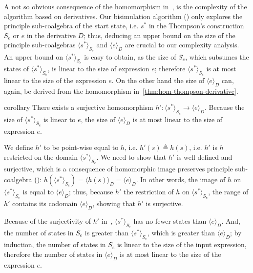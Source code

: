 \documentclass[conference]{IEEEtran}
\begin{document}
A not so obvious consequence of the homomorphism in~, is the complexity of the algorithm based on derivatives.
Our bisimulation algorithm () only explores the principle sub-coalgebra of the start state, i.e. \(s^*\) in the Thompson's construction \(Ŝ_{e}\) or \(e\) in the derivative \(D̂\); thus, deducing an upper bound on the size of the principle sub-coalgebras \(⟨s^*⟩_{Ŝ_{e}}\) and \(⟨e⟩_{D̂}\) are crucial to our complexity analysis.
An upper bound on \(⟨s^*⟩_{Ŝ_{e}}\) is easy to obtain, as the size of \(Ŝ_{e}\), which subsumes the states of \(⟨s^*⟩_{Ŝ_{e}}\), is linear to the size of expression \(e\); therefore \(⟨s^*⟩_{Ŝ_{e}}\) is at most linear to the size of the expression \(e\).
On the other hand the size of \(⟨e⟩_{D̂}\) can, again, be derived from the homomorphism in~\cref{thm:hom-thompson-derivative}.

\begin{theoremEnd}{corollary}\label{thm:suj-hom-thompson-derivative}
    There exists a surjective homomorphism \(h': ⟨s^*⟩_{Ŝ_{e}} → ⟨e⟩_{D̂}\). 
    Because the size of \(⟨s^*⟩_{Ŝ_{e}}\) is linear to \(e\), the size of \(⟨e⟩_{D̂}\) is at most linear to the size of expression \(e\).
\end{theoremEnd}

\begin{proofEnd}
    We define \(h'\) to be point-wise equal to \(h\), i.e. \(h'(s) ≜ h(s)\), i.e. \(h'\) is \(h\) restricted on the domain \(⟨s^*⟩_{Ŝ_{e}}\). 
    We need to show that \(h'\) is well-defined and surjective, which is a consequence of homomorphic image preserves principle sub-coalgebra (): \(h(⟨s^*⟩_{Ŝ_{e}}) = ⟨h(s)⟩_{D̂} = ⟨e⟩_{D̂}.\)
    In other words, the image of \(h\) on \(⟨s^*⟩_{Ŝ_{e}}\) is equal to \(⟨e⟩_{D̂}\); thus, because \(h'\) the restriction of \(h\) on \(⟨s^*⟩_{Ŝ_{e}}\), the range of \(h'\) contains its codomain \(⟨e⟩_{D̂}\), showing that \(h'\) is surjective.
\end{proofEnd}

Because of the surjectivity of \(h'\) in~, \(⟨s^*⟩_{Ŝ_{e}}\) has no fewer states than \(⟨e⟩_{D̂}\).
And, the number of states in \(Ŝ_{e}\) is greater than \(⟨s^*⟩_{Ŝ_{e}}\), which is greater than \(⟨e⟩_{D̂}\); by induction, the number of states in \(Ŝ_{e}\) is linear to the size of the input expression, therefore the number of states in \(⟨e⟩_{D̂}\) is at most linear to the size of the expression \(e\). 
\end{document}
